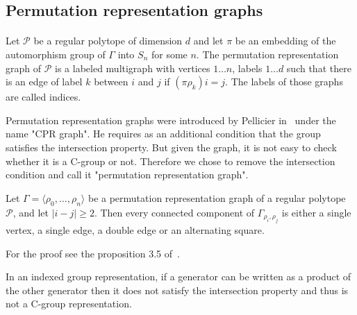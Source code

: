 \subsection{Permutation representation graphs}

\paragraph{}

\begin{definition}
  Let $\mathcal P$ be a regular polytope of dimension $d$ and let $\pi$ be an embedding of the automorphism group of $\Gamma$ into $S_n$ for some $n$. The permutation representation graph of $\mathcal P$ is a labeled multigraph with vertices ${1 \dots n}$, labels ${1 \dots d}$ such that there is an edge of label $k$ between $i$ and $j$ if $(\pi \rho_k)i = j$. The labels of those graphs are called indices.
\end{definition}

Permutation representation graphs were introduced by Pellicier in~\cite{cprGraph} under the name "CPR graph". He requires as an additional condition that the group satisfies the intersection property. But given the graph, it is not easy to check whether it is a C-group or not. Therefore we chose to remove the intersection condition and call it "permutation representation graph".

\begin{property}
  \label{intersection-patterns}
  Let $\Gamma = \langle \rho_0, \dots, \rho_n \rangle$ be a permutation representation graph of a regular polytope $\mathcal P$, and let $|i - j| \ge 2$. Then every connected component of $\Gamma_{\rho_i,\rho_j}$ is either a single vertex, a single edge, a double edge or an alternating square.
\end{property}

For the proof see the proposition 3.5 of~\cite{cprGraph}.

\begin{property}
  \label{generators-not-free}
  In an indexed group representation, if a generator can be written as a product of the other generator then it does not satisfy the intersection property and thus is not a C-group representation.
\end{property}
